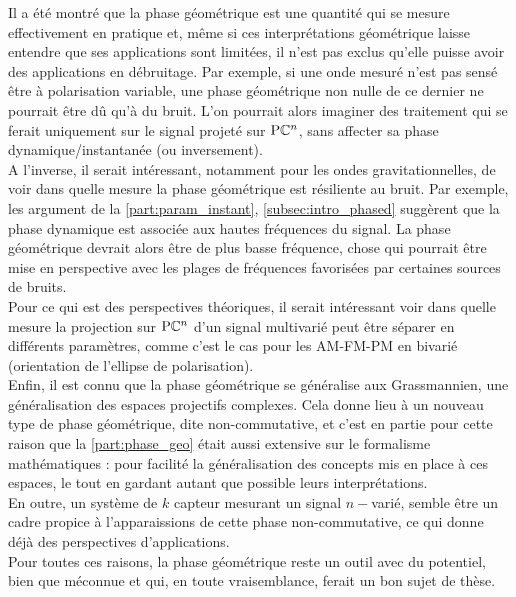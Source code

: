 Il a été montré que la phase géométrique est une quantité qui se mesure effectivement en pratique et, même si ces interprétations géométrique laisse entendre que ses applications sont limitées, il n'est pas exclus qu'elle puisse avoir des applications en débruitage. Par exemple, si une onde mesuré n'est pas sensé être à polarisation variable, une phase géométrique non nulle de ce dernier ne pourrait être dû qu'à du bruit. L'on pourrait alors imaginer des traitement qui se ferait uniquement sur le signal projeté sur $\text{\normalfont P}\mathbb{C}^{n}$, sans affecter sa phase dynamique/instantanée (ou inversement).
\\
A l'inverse, il serait intéressant, notamment pour les ondes gravitationnelles, de voir dans quelle mesure la phase géométrique est résiliente au bruit. Par exemple, les argument de la \cref{part:param_instant}, \cref{subsec:intro_phased} suggèrent que la phase dynamique est associée aux hautes fréquences du signal. La phase géométrique devrait alors être de plus basse fréquence, chose qui pourrait être mise en perspective avec les plages de fréquences favorisées par certaines sources de bruits.
\\

Pour ce qui est des perspectives théoriques, il serait intéressant voir dans quelle mesure la projection sur $\text{\normalfont P}\mathbb{C}^{n}$ d'un signal multivarié peut être séparer en différents paramètres, comme c'est le cas pour les AM-FM-PM en bivarié (orientation de l'ellipse de polarisation).
\\
Enfin, il est connu que la phase géométrique se généralise aux Grassmannien, une généralisation des espaces projectifs complexes. Cela donne lieu à un nouveau type de phase géométrique, dite non-commutative, et c'est en partie pour cette raison que la \cref{part:phase_geo} était aussi extensive sur le formalisme mathématiques : pour facilité la généralisation des concepts mis en place à ces espaces, le tout en gardant autant que possible leurs interprétations.
\\
En outre, un système de $k$ capteur mesurant un signal $n-$varié, semble être un cadre propice à l'apparaissions de cette phase non-commutative, ce qui donne déjà des perspectives d'applications.
\\

Pour toutes ces raisons, la phase géométrique reste un outil avec du potentiel, bien que méconnue et qui, en toute vraisemblance, ferait un bon sujet de thèse.
